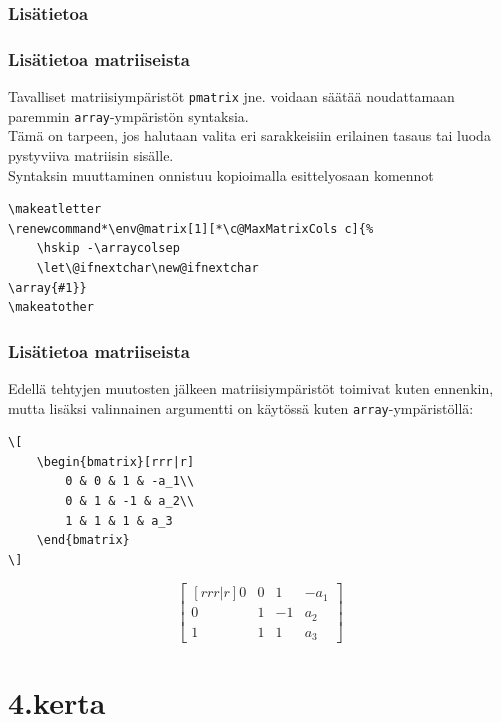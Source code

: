 \documentclass[handout,hyperref={colorlinks=true}]{beamer}
\makeatletter
\theoremstyle{remark}
\newcommand{\vaihto}{\\ \vspace{10pt}}
\renewcommand*\env@matrix[1][*\c@MaxMatrixCols c]{%
    \hskip -\arraycolsep
    \let\@ifnextchar\new@ifnextchar
\array{#1}}
\makeatother
\begin{document}
\subsubsection{Lisätietoa}
\begin{frame}[fragile]
    \frametitle{Lisätietoa matriiseista}
    Tavalliset matriisiympäristöt \verb-pmatrix- jne. voidaan säätää noudattamaan paremmin \verb-array--ympäristön syntaksia.
    \vaihto
    Tämä on tarpeen, jos halutaan valita eri sarakkeisiin erilainen tasaus tai luoda pystyviiva matriisin sisälle. 
    \vaihto
    Syntaksin muuttaminen onnistuu kopioimalla esittelyosaan komennot\vaihto
    \begin{Verbatim}[frame=single]
\makeatletter
\renewcommand*\env@matrix[1][*\c@MaxMatrixCols c]{%
    \hskip -\arraycolsep
    \let\@ifnextchar\new@ifnextchar
\array{#1}}
\makeatother
    \end{Verbatim}
\end{frame}
\begin{frame}[fragile]
    \frametitle{Lisätietoa matriiseista}
    Edellä tehtyjen muutosten jälkeen matriisiympäristöt toimivat kuten ennenkin, mutta lisäksi valinnainen argumentti on käytössä kuten \verb-array--ympäristöllä:
    \vaihto
    \begin{minipage}{4.2cm}
        \begin{scriptsize}
            \begin{Verbatim}[frame=single]
\[
    \begin{bmatrix}[rrr|r]
        0 & 0 & 1 & -a_1\\
        0 & 1 & -1 & a_2\\
        1 & 1 & 1 & a_3
    \end{bmatrix}
\]
            \end{Verbatim}
        \end{scriptsize}
    \end{minipage}
    \begin{minipage}{4cm}
        \[
            \begin{bmatrix}[rrr|r]
                0 & 0 & 1 & -a_1\\
                0 & 1 & -1 & a_2\\
                1 & 1 & 1 & a_3
            \end{bmatrix}
        \]
    \end{minipage}
\end{frame}


\section{4.kerta}
\end{document}

